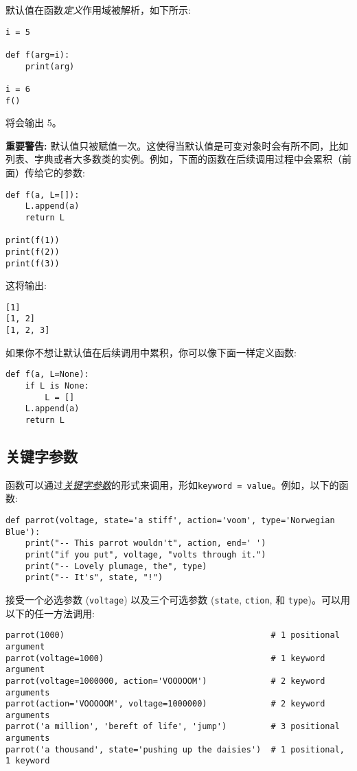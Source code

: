 默认值在函数\emph{定义}作用域被解析，如下所示:
\begin{lstlisting}
i = 5

def f(arg=i):
    print(arg)

i = 6
f()
\end{lstlisting}
将会输出 5。

\textbf{重要警告:} 默认值只被赋值一次。这使得当默认值是可变对象时会有所不同，比如列表、字典或者大多数类的实例。例如，下面的函数在后续调用过程中会累积（前面）传给它的参数:
\begin{lstlisting}
def f(a, L=[]):
    L.append(a)
    return L

print(f(1))
print(f(2))
print(f(3))
\end{lstlisting}
这将输出:
\begin{lstlisting}
[1]
[1, 2]
[1, 2, 3]
\end{lstlisting}

如果你不想让默认值在后续调用中累积，你可以像下面一样定义函数:
\begin{lstlisting}
def f(a, L=None):
    if L is None:
        L = []
    L.append(a)
    return L
\end{lstlisting}
\subsection{关键字参数}
函数可以通过\href{https://docs.python.org/3/glossary.html#term-keyword-argument}{\emph{关键字参数}}的形式来调用，形如\texttt{keyword = value}。例如，以下的函数:
\begin{lstlisting}
def parrot(voltage, state='a stiff', action='voom', type='Norwegian Blue'):
    print("-- This parrot wouldn't", action, end=' ')
    print("if you put", voltage, "volts through it.")
    print("-- Lovely plumage, the", type)
    print("-- It's", state, "!")
\end{lstlisting}
接受一个必选参数 (\texttt{voltage}) 以及三个可选参数 (\texttt{state}, \texttt{ction}, 和 \texttt{type})。可以用以下的任一方法调用:
\begin{lstlisting}
parrot(1000)                                          # 1 positional argument
parrot(voltage=1000)                                  # 1 keyword argument
parrot(voltage=1000000, action='VOOOOOM')             # 2 keyword arguments
parrot(action='VOOOOOM', voltage=1000000)             # 2 keyword arguments
parrot('a million', 'bereft of life', 'jump')         # 3 positional arguments
parrot('a thousand', state='pushing up the daisies')  # 1 positional, 1 keyword
\end{lstlisting}

